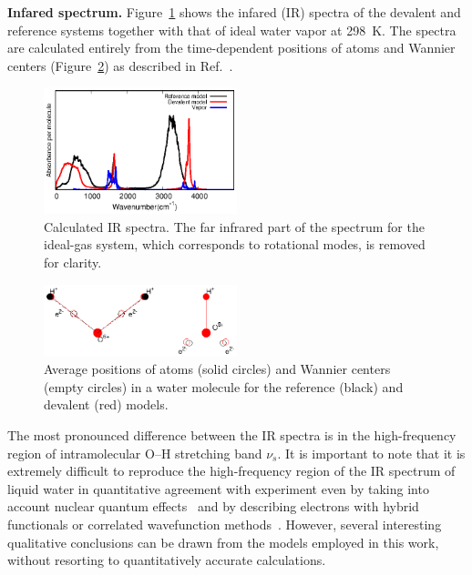 \documentclass[journal=jacsat,manuscript=article]{achemso}
\begin{document}

\textbf{Infared spectrum.} Figure~\ref{Fig:IR} shows the infared (IR) spectra of the devalent and reference systems together with that of ideal water vapor at 298~K. The spectra are calculated entirely from the time-dependent positions of atoms and Wannier centers (Figure~\ref{Fig:acoord}) as described in Ref.~.

\begin{figure}
\centering
\includegraphics[width=0.5\textwidth]{new_ir}
\caption{Calculated IR spectra. The far infrared part of the spectrum for the ideal-gas system, which corresponds to rotational modes, is removed for clarity. 
} \label{Fig:IR}
\end{figure}

\begin{figure}
\includegraphics[width=0.5\textwidth]{acoord}
\caption{Average positions of atoms (solid circles) and Wannier centers (empty circles) in a water molecule for the reference (black) and devalent (red) models. 
} \label{Fig:acoord}
\end{figure}

The most pronounced difference between the IR spectra is in the high-frequency region of intramolecular O--H stretching band $\nu_s$. 
%
It is important to note that it is extremely difficult to reproduce the high-frequency region of the IR spectrum of liquid water in quantitative agreement with experiment even by taking into account nuclear quantum effects~\cite{marsalek2017quantum} and by describing electrons with hybrid functionals or correlated wavefunction methods~\cite{medders2015infrared}. 
However, several interesting qualitative conclusions can be drawn from the models employed in this work, without resorting to quantitatively accurate calculations. 
\end{document}
